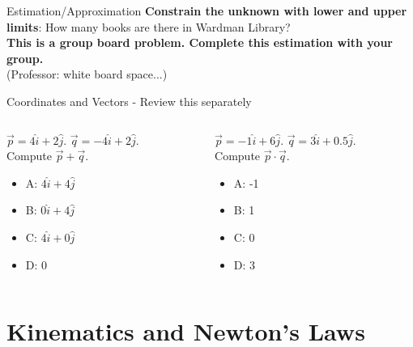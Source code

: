 \documentclass{beamer}
\begin{document}
\begin{frame}{Estimation/Approximation}
\textbf{Constrain the unknown with lower and upper limits}: How many books are there in Wardman Library? \\ \vspace{0.5cm}
\textbf{This is a group board problem.  Complete this estimation with your group.} \\ \vspace{0.5cm}
(Professor: white board space...)
\end{frame}

\begin{frame}{Coordinates and Vectors - Review this separately}
\small
\begin{columns}[T]
\begin{column}{0.5\textwidth}
$\vec{p} = 4\hat{i}+2\hat{j}$.  $\vec{q} = -4\hat{i}+2\hat{j}$.  \\
Compute $\vec{p} + \vec{q}$.
\vspace{0.2cm}
\begin{itemize}
\item A: $4\hat{i}+4\hat{j}$
\item B: $0\hat{i}+4\hat{j}$
\item C: $4\hat{i}+0\hat{j}$
\item D: 0
\end{itemize}
\end{column}
\begin{column}{0.5\textwidth}
$\vec{p} = -1\hat{i}+6\hat{j}$.  $\vec{q} = 3\hat{i}+0.5\hat{j}$.  \\
Compute $\vec{p} \cdot \vec{q}$.
\vspace{0.2cm}
\begin{itemize}
\item A: -1
\item B: 1
\item C: 0
\item D: 3
\end{itemize}
\end{column}
\end{columns}
\end{frame}

\section{Kinematics and Newton's Laws}
\end{document}
